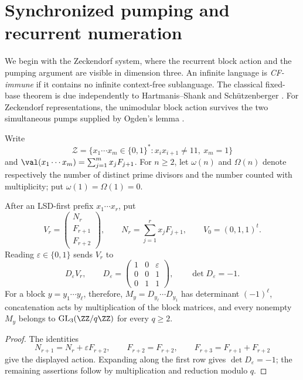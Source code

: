 \section{Synchronized pumping and recurrent numeration}
\label{sec:context-free-pisot}

We begin with the Zeckendorf system, where the recurrent block action and
the pumping argument are visible in dimension three. An infinite language
is \emph{CF-immune} if it contains no infinite context-free sublanguage.
The classical fixed-base theorem is due independently to Hartmanis--Shank
and Sch\"utzenberger \cite{HartmanisShank1968,Schutzenberger1968}. For
Zeckendorf representations, the unimodular block action survives the two
simultaneous pumps supplied by Ogden's lemma \cite{Ogden1968}.

Write
\[
  \mathcal Z=\{x_1\cdots x_m\in\{0,1\}^\ast:
      x_ix_{i+1}\ne11,\ x_m=1\}
\]
and \(\val(x_1\cdots x_m)=\sum_{j=1}^m x_jF_{j+1}\).
For \(n\ge2\), let \(\omega(n)\) and \(\Omega(n)\) denote respectively
the number of distinct prime divisors and the number counted with
  multiplicity; put \(\omega(1)=\Omega(1)=0\).

\begin{lemma}
  \label{lem:main-zeckendorf-unimodular-block-action}
  After an LSD-first prefix \(x_1\cdots x_r\), put
  \[
    V_r=\begin{pmatrix}N_r\\F_{r+1}\\F_{r+2}\end{pmatrix},
    \qquad N_r=\sum_{j=1}^r x_jF_{j+1},
    \qquad V_0=(0,1,1)^t.
  \]
  Reading \(\varepsilon\in\{0,1\}\) sends \(V_r\) to
  \[
    D_\varepsilon V_r,
    \qquad
    D_\varepsilon=
    \begin{pmatrix}
      1&0&\varepsilon\\
      0&0&1\\
      0&1&1
    \end{pmatrix},
    \qquad \det D_\varepsilon=-1.
  \]
  For a block \(y=y_1\cdots y_\ell\), therefore,
  \(M_y=D_{y_\ell}\cdots D_{y_1}\) has determinant
  \((-1)^\ell\), concatenation acts by multiplication of the block
  matrices, and every nonempty \(M_y\) belongs to
  \(\operatorname{GL}_3(\ZZ/q\ZZ)\) for every \(q\ge2\).
\end{lemma}

\begin{proof}
  The identities
  \[
    N_{r+1}=N_r+\varepsilon F_{r+2},\qquad
    F_{r+2}=F_{r+2},\qquad F_{r+3}=F_{r+1}+F_{r+2}
  \]
  give the displayed action. Expanding along the first row gives
  \(\det D_\varepsilon=-1\); the remaining assertions follow by
  multiplication and reduction modulo \(q\).
\end{proof}

